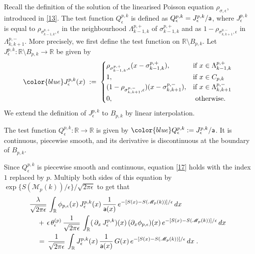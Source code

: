 \documentclass[reqno]{amsart}
\theoremstyle{plain}
\theoremstyle{definition}
\newcommand{\bb}[1]{{\mathbb #1}}
\newcommand{\ms}[1]{{\mathscr #1}}
\newcommand{\mss}[1]{{\textsf #1}}
\newcounter{as}[section]
\newcommand{\<}{\langle}
\renewcommand{\>}{\rangle}
\begin{document}
Recall the definition of the solution of the linearised Poisson
equation $\rho_{\sigma, \epsilon}$, introduced in \eqref{13}.  The
test function $Q_{\epsilon}^{p,k}$ is defined as
$Q_{\epsilon}^{p,k} = J_{\epsilon}^{p,k}/\mss a$, where
$J_{\epsilon}^{p,k}$ is equal to
$\rho_{\sigma^{p,+}_{k-1,k}, \epsilon}$ in the neighbourhood
$\Lambda^{p,+}_{k-1,k} $ of $\sigma^{p,+}_{k-1,k}$ and as
$1 - \rho_{\sigma^{p,-}_{k,k+1}, \epsilon}$ in
$\Lambda^{p,-}_{k,k+1}$. More precisely, we first define the test
function on $\bb R \setminus B_{p,k}$. Let
$J_{\epsilon}^{p,k}\colon \bb R \setminus B_{p,k} \to \bb R$
be given by
\begin{equation}
\label{12b}
{\color{blue} J_{\epsilon}^{p,k}(x) } \;:=\;
\begin{cases} \rho_{\sigma^{p,+}_{k-1,k},\epsilon} (x-\sigma^{p,+}_{k-1,k}),
&\text{if } x\in \Lambda^{p,+}_{k-1,k} 
\\
1 , &\text{if } x\in C_{p,k}
\\
(1 - \rho_{\sigma^{p,-}_{k,k+1} ,\epsilon})  (x- \sigma^{p,-}_{k,k+1}), &\text{if }
x\in \Lambda^{p,-}_{k,k+1} 
\\
0, &\text{ otherwise. }
\end{cases}
\end{equation} 
We extend the definition of $J_{\epsilon}^{p,k}$ to $B_{p,k}$
by linear interpolation. 

The test function $Q_{\epsilon}^{p,k} \colon \bb R \to \bb R$ is given
by $\color{blue} Q_{\epsilon}^{p,k} := J_{\epsilon}^{p,k}/\mss a$.  It
is continuous, piecewise smooth, and its derivative is discontinuous
at the boundary of $B_{p,k}$.

Since $Q_{\epsilon}^{p,k}$ is piecewise smooth and continuous,
equation \eqref{17} holds with the index $1$ replaced by $p$. Multiply
both sides of this equation by
$\exp\{S(\ms M_p(k)) /\epsilon\} / \sqrt{2\pi \epsilon}$ to get that
\begin{equation}
\label{61}
\begin{aligned}
& \frac{\lambda }{\sqrt{2\pi \epsilon}}\,
\int_{\bb R}\phi_{p,\epsilon}(x)\, J_{\epsilon}^{p,k}(x)\,
\frac{1}{\mss a(x)}\, 
e^{- [S(x)-S(\ms M_p(k))]/\epsilon}\, dx
\\
&\quad 
\,+\, \epsilon \, \theta^{(p)}_{\epsilon}\,
\frac{1}{\sqrt{2\pi \epsilon}}\, \int_{\bb R} (\, \partial_x \,
J_{\epsilon}^{p,k} )(x) \, (\partial_x \phi_{p,\epsilon}) (x) \,
e^{-[S(x)-S(\ms M_p(k))]/\epsilon} \, dx
\\
& \quad \,=\, \frac{1}{\sqrt{2\pi \epsilon}}\, \int_{\bb R}
J_{\epsilon}^{p,k}(x)\, \frac{1}{\mss a(x)} \,  G (x) \,
e^{-[S(x)-S(\ms M_p(k))] /\epsilon} \, dx\;.
\end{aligned}
\end{equation}
\end{document}
